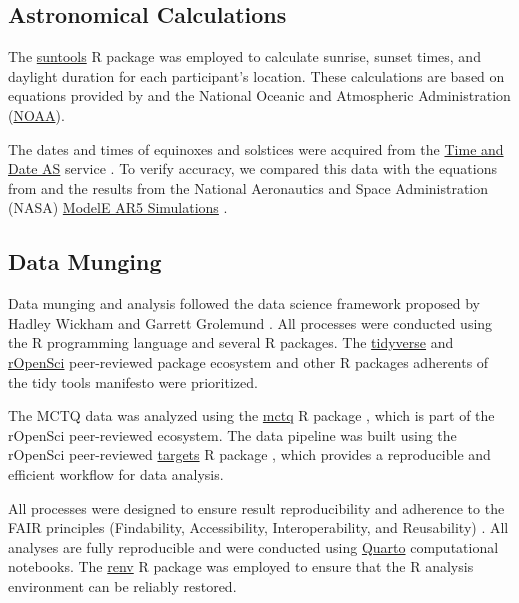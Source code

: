 \documentclass[
12pt,
openright,
oneside,
a4paper,
chapter=TITLE,
section=TITLE,
french,
spanish,
brazil,
english
]{abntex2}
\begin{document}
\subsection{Astronomical Calculations}\label{astronomical-calculations}

The \href{https://doi.org/10.32614/CRAN.package.suntools}{suntools} R
package \autocite{bivand} was employed to calculate sunrise, sunset
times, and daylight duration for each participant's location. These
calculations are based on equations provided by \textcite{meeus1991} and
the National Oceanic and Atmospheric Administration
(\href{https://gml.noaa.gov/grad/solcalc/calcdetails.html}{NOAA}).

The dates and times of equinoxes and solstices were acquired from the
\href{https://www.timeanddate.com/calendar/seasons.html?year=2000&n=1440}{Time
and Date AS} service \autocite{timeanddateas}. To verify accuracy, we
compared this data with the equations from \textcite{meeus1991} and the
results from the National Aeronautics and Space Administration (NASA)
\href{https://data.giss.nasa.gov/modelE/ar5plots/srvernal.html}{ModelE
AR5 Simulations} \autocite{nasa}.

\subsection{Data Munging}\label{data-munging}

Data munging and analysis followed the data science framework proposed
by Hadley Wickham and Garrett Grolemund \autocite{wickham2023e}. All
processes were conducted using the R programming language
\autocite{rcoreteama} and several R packages. The
\href{https://www.tidyverse.org/}{tidyverse} and
\href{https://ropensci.org/}{rOpenSci} peer-reviewed package ecosystem
and other R packages adherents of the tidy tools manifesto
\autocite{wickham2023c} were prioritized.

The MCTQ data was analyzed using the
\href{https://docs.ropensci.org/mctq/}{mctq} R package
\autocite{vartanianh}, which is part of the rOpenSci peer-reviewed
ecosystem. The data pipeline was built using the rOpenSci peer-reviewed
\href{https://books.ropensci.org/targets/}{targets} R package
\autocite{landau2021a}, which provides a reproducible and efficient
workflow for data analysis.

All processes were designed to ensure result reproducibility and
adherence to the FAIR principles (Findability, Accessibility,
Interoperability, and Reusability) \autocite{wilkinson2016}. All
analyses are fully reproducible and were conducted using
\href{https://quarto.org/}{Quarto} computational notebooks. The
\href{https://rstudio.github.io/renv/}{renv} R package \autocite{usheya}
was employed to ensure that the R analysis environment can be reliably
restored.
\end{document}

